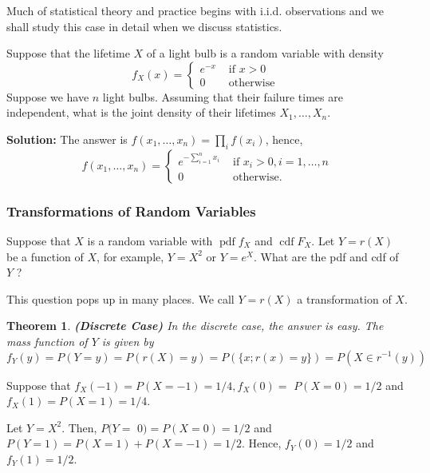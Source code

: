 \documentclass[13pt]{article}
\newtheorem{theorem}{Theorem}[section]
\theoremstyle{definition}
\newenvironment{solution}
{\color{C2}\begin{framed}\begingroup\textbf{Solution:} }
  {\endgroup\end{framed}}
\theoremstyle{remark}
\newenvironment{remark}
  {\pushQED{\qed}\renewcommand{\qedsymbol}{$\triangle$}\remarkx}
  {\popQED\endremarkx}
\begin{document}
Much of statistical theory and practice begins with i.i.d. observations and we shall study this case in detail when we discuss statistics.

\begin{remark}\hfill

    Suppose that the lifetime $X$ of a light bulb is a random variable with density
$$
f_{X}(x)= \begin{cases}e^{-x} & \text { if } x>0 \\ 0 & \text { otherwise }\end{cases}
$$
Suppose we have $n$ light bulbs. Assuming that their failure times are independent, what is the joint density of their lifetimes $X_{1}, \ldots, X_{n}$. 
\begin{solution}The answer is $f\left(x_{1}, \ldots, x_{n}\right)=\prod_{i} f\left(x_{i}\right)$, hence,
$$
f\left(x_{1}, \ldots, x_{n}\right)= \begin{cases}e^{-\sum_{i=1}^{n} x_{i}} & \text { if } x_{i}>0, i=1, \ldots, n \\ 0 & \text { otherwise. }\end{cases}
$$
\end{solution}
\end{remark} 

\subsubsection{Transformations of Random Variables}
Suppose that $X$ is a random variable with $\operatorname{pdf} f_{X}$ and $\operatorname{cdf} F_{X}$. Let $Y=r(X)$ be a function of $X$, for example, $Y=X^{2}$ or $Y=e^{X}$. What are the pdf and cdf of $Y$ ? 

This question pops up in many places. We call $Y=r(X)$ a transformation of $X$. 

\begin{theorem}\textbf{(Discrete Case)} In the discrete case, the answer is easy. The mass function of $Y$ is given by
$$
f_{Y}(y)=P(Y=y)=P(r(X)=y)=P(\{x ; r(x)=y\})=P\left(X \in r^{-1}(y)\right)
$$
\end{theorem}

\begin{remark}Suppose that $f_{X}(-1)=P(X=-1)=1 / 4, f_{X}(0)=$ $P(X=0)=1 / 2$ and $f_{X}(1)=P(X=1)=1 / 4$. 

Let $Y=X^{2}$. Then, $P(Y=$ $0)=P(X=0)=1 / 2$ and $P(Y=1)=P(X=1)+P(X=-1)=1 / 2$. Hence, $f_{Y}(0)=1 / 2$ and $f_{Y}(1)=1 / 2$.
\end{remark}
\end{document}
